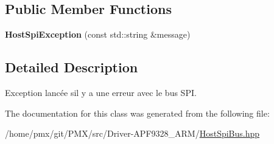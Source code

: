 \subsection*{Public Member Functions}
\begin{DoxyCompactItemize}
\item 
\mbox{\label{classHostSpiException_aae0e2ca48f87e09b44c1875f73cf8613}} 
{\bfseries Host\+Spi\+Exception} (const std\+::string \&message)
\end{DoxyCompactItemize}


\subsection{Detailed Description}
Exception lancée s\textquotesingle{}il y a une erreur avec le bus S\+PI. 

The documentation for this class was generated from the following file\+:\begin{DoxyCompactItemize}
\item 
/home/pmx/git/\+P\+M\+X/src/\+Driver-\/\+A\+P\+F9328\+\_\+\+A\+R\+M/\hyperlink{HostSpiBus_8hpp}{Host\+Spi\+Bus.\+hpp}\end{DoxyCompactItemize}
